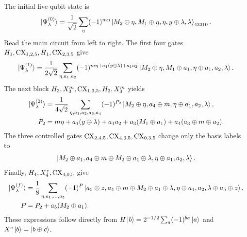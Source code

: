 \documentclass[10pt,a4paper]{article}
\begin{document}
The initial five-qubit state is
\begin{equation}
\ket{\Psi^{(0)}_\lambda}=\frac1{\sqrt2}\sum_\eta(-1)^{m\eta}
\ket{M_2\oplus\eta,M_1\oplus\eta,\eta,y\oplus\lambda,\lambda}_{43210}.
\end{equation}
Read the main circuit from left to right. The first four gates $H_1,\mathrm{CX}_{1,2,5},H_1,\mathrm{CX}_{2,3,5}$ give
\begin{equation}
\ket{\Psi^{(1)}_\lambda}=\frac1{2\sqrt2}\sum_{\eta,a_1,a_2}
(-1)^{m\eta+a_1(y\oplus\lambda)+a_1a_2}
\ket{M_2\oplus\eta,M_1\oplus a_1,\eta\oplus a_1,a_2,\lambda}.
\end{equation}
The next block $H_3,X_3^m,\mathrm{CX}_{1,3,5},H_3,X_3^m$ yields
\begin{align}
\ket{\Psi^{(2)}_\lambda}
 &=\frac1{4\sqrt2}\sum_{\eta,a_1,a_2,a_3,a_4}(-1)^{P_2}
 \ket{M_2\oplus\eta,a_4\oplus m,\eta\oplus a_1,a_2,\lambda},\\
 P_2&=m\eta+a_1(y\oplus\lambda)+a_1a_2+a_3(M_1\oplus a_1)
       +a_4(a_3\oplus m\oplus a_2).
\end{align}
The three controlled gates $\mathrm{CX}_{2,4,5},\mathrm{CX}_{4,3,5},\mathrm{CX}_{0,3,5}$ change only the basis labels to
\begin{equation}
\ket{M_2\oplus a_1,a_4\oplus m\oplus M_2\oplus a_1\oplus\lambda,
\eta\oplus a_1,a_2,\lambda}.
\end{equation}
Finally, $H_4,X_4^z,\mathrm{CX}_{4,0,5}$ give
\begin{align}
\ket{\Psi^{(f)}_\lambda}
 &=\frac18\sum_{\eta,a_1,\ldots,a_5}(-1)^P
 \ket{a_5\oplus z,a_4\oplus m\oplus M_2\oplus a_1\oplus\lambda,
 \eta\oplus a_1,a_2,\lambda\oplus a_5\oplus z},\\
 P&=P_2+a_5(M_2\oplus a_1).
\end{align}
These expressions follow directly from
$H\ket b=2^{-1/2}\sum_a(-1)^{ba}\ket a$ and $X^c\ket b=\ket{b\oplus c}$.
\end{document}
